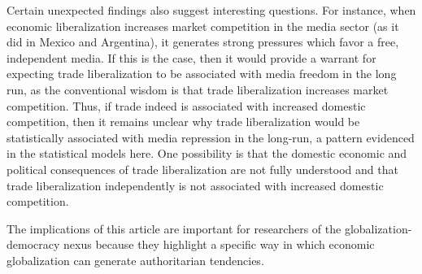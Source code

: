 \documentclass[12pt,a4paper]{article}\usepackage[]{graphicx}\usepackage[]{color}
\begin{document}
Certain unexpected findings also suggest interesting questions. For instance, when economic liberalization increases market competition in the media sector (as it did in Mexico and Argentina), it generates strong pressures which favor a free, independent media. If this is the case, then it would provide a warrant for expecting trade liberalization to be associated with media freedom in the long run, as the conventional wisdom is that trade liberalization increases market competition. Thus, if trade indeed is associated with increased domestic competition, then it remains unclear why trade liberalization would be statistically associated with media repression in the long-run, a pattern evidenced in the statistical models here. One possibility is that the domestic economic and political consequences of trade liberalization are not fully understood and that trade liberalization independently is not associated with increased domestic competition.

The implications of this article are important for researchers of the globalization-democracy nexus because they highlight a specific way in which economic globalization can generate authoritarian tendencies.


\pagebreak

\begingroup
{}
\setlength\bibitemsep{7pt}




\printbibliography
\endgroup
\end{document}
